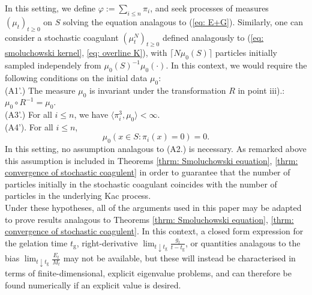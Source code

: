 In this setting, we define $\varphi:=\sum_{i\le n} \pi_i$, and seek processes of measures $(\mu_t)_{t\ge 0}$ on $S$ solving the equation analagous to (\ref{eq: E+G}). Similarly, one can consider a stochastic coagulant $(\mu^N_t)_{t\ge 0}$ defined analagously to (\ref{eq: smoluchowski kernel}, \ref{eq: overline K}), with $\lceil N \mu_0(S)\rceil$ particles initially sampled independely from $\mu_0(S)^{-1}\mu_0(\cdot)$. In this context, we would require the following conditions on the initial data $\mu_0$: 
\\ (A1'.) The measure $\mu_0$ is invariant under the transformation $R$ in point iii).: $\mu_0\circ R^{-1}=\mu_0.$
\\ (A3'.) For all $i\le n$, we have $\langle \pi_i^3, \mu_0\rangle <\infty.$
\\ (A4'). For all $i \le n$, \begin{equation} \mu_0(x\in S: \pi_i(x)=0)=0.\end{equation} In this setting, no assumption analagous to (A2.) is necessary. As remarked above this assumption is included in Theorems \ref{thrm: Smoluchowski equation}, \ref{thrm: convergence of stochastic coagulent} in order to guarantee that the number of particles initially in the stochastic coagulant coincides with the number of particles in the underlying Kac process. \medskip \\ Under these hypotheses, all of the arguments used in this paper may be adapted to prove results analagous to Theorems \ref{thrm: Smoluchowski equation}, \ref{thrm: convergence of stochastic coagulent}. In this context, a closed form expression for the gelation time $t_\mathrm{g}$, right-derivative $\lim_{t\downarrow t_\mathrm{g}} \frac{g_t}{t-t_\mathrm{g}}$, or quantities analagous to the bias $\lim_{t\downarrow t_\mathrm{g}} \frac{E_t}{M_t}$ may not be available, but these will instead be characterised in terms of finite-dimensional, explicit eigenvalue problems, and can therefore be found numerically if an explicit value is desired.

